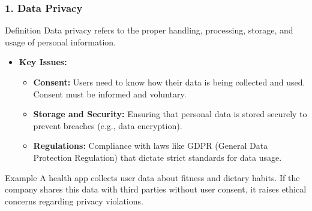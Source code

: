 \documentclass[aspectratio=169]{beamer}
\begin{document}
\begin{frame}[fragile]
    \frametitle{1. Data Privacy}
    \begin{block}{Definition}
        Data privacy refers to the proper handling, processing, storage, and usage of personal information.
    \end{block}
    
    \begin{itemize}
        \item \textbf{Key Issues:}
            \begin{itemize}
                \item \textbf{Consent:} Users need to know how their data is being collected and used. Consent must be informed and voluntary.
                \item \textbf{Storage and Security:} Ensuring that personal data is stored securely to prevent breaches (e.g., data encryption).
                \item \textbf{Regulations:} Compliance with laws like GDPR (General Data Protection Regulation) that dictate strict standards for data usage.
            \end{itemize}
    \end{itemize}
    
    \begin{block}{Example}
        A health app collects user data about fitness and dietary habits. If the company shares this data with third parties without user consent, it raises ethical concerns regarding privacy violations.
    \end{block}
\end{frame}
\end{document}
